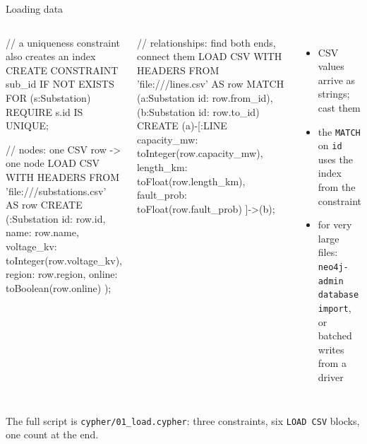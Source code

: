 \documentclass[aspectratio=169, 10pt]{beamer}
\newcommand{\kicker}[1]{{\color{muted}\small #1}}
\begin{document}
\begin{frame}[fragile]{Loading data}
  \vspace{0.1cm}
  \begin{columns}[T]
      \begin{code}
// a uniqueness constraint also creates an index
CREATE CONSTRAINT sub_id IF NOT EXISTS
  FOR (s:Substation) REQUIRE s.id IS UNIQUE;

// nodes: one CSV row -> one node
LOAD CSV WITH HEADERS
  FROM 'file:///substations.csv' AS row
CREATE (:Substation {
  id: row.id, name: row.name,
  voltage_kv: toInteger(row.voltage_kv),
  region: row.region,
  online: toBoolean(row.online)
});
      \end{code}
      \begin{code}
// relationships: find both ends, connect them
LOAD CSV WITH HEADERS
  FROM 'file:///lines.csv' AS row
MATCH (a:Substation {id: row.from_id}),
      (b:Substation {id: row.to_id})
CREATE (a)-[:LINE {
  capacity_mw: toInteger(row.capacity_mw),
  length_km:   toFloat(row.length_km),
  fault_prob:  toFloat(row.fault_prob)
}]->(b);
      \end{code}
      \small
      \begin{itemize}
        \item CSV values arrive as strings; cast them
        \item the \texttt{MATCH} on \texttt{id} uses the index from the constraint
        \item for very large files: \texttt{neo4j-admin database import}, or batched writes from a driver
      \end{itemize}
  \end{columns}
  \vspace{0.1cm}
  \kicker{The full script is \texttt{cypher/01\_load.cypher}: three constraints, six \texttt{LOAD CSV} blocks, one count at the end.}
\end{frame}
\end{document}
